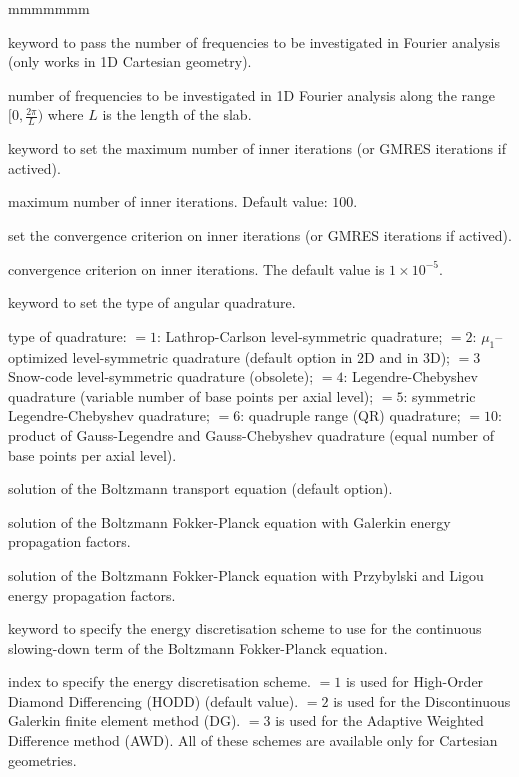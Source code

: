 \begin{ListeDeDescription}{mmmmmmm}
\item[\moc{FOUR}] keyword to pass the number of frequencies to be investigated in Fourier analysis (only works in 1D Cartesian geometry).
\item[\dusa{nfou}] number of frequencies to be investigated in 1D Fourier analysis along the range $[0, \frac{2\pi}{L})$ where $L$ is the length of the slab.

\item[\moc{MAXI}] keyword to set the maximum number of inner iterations (or GMRES iterations if actived).
\item[\dusa{maxi}] maximum number of inner iterations. Default value: $100$.

\item[\moc{EPSI}] set the convergence criterion on inner iterations (or GMRES iterations if actived).
\item[\dusa{epsi}] convergence criterion on inner iterations. The default value is $1\times 10^{-5}$.
\item[\moc{QUAD}] keyword to set the type of angular quadrature.

\item[\dusa{iquad}] type of quadrature: $=1$: Lathrop-Carlson level-symmetric quadrature;
$=2$: $\mu_1$--optimi\-zed level-symmetric quadrature (default option in 2D and in 3D); $=3$ Snow-code level-symmetric quadrature
(obsolete); $=4$: Legendre-Chebyshev quadrature (variable number of base points
per axial level); $=5$: symmetric Legendre-Chebyshev quadrature; $=6$: quadruple range (QR)
quadrature;\cite{quadrupole} $=10$: product of Gauss-Legendre and Gauss-Chebyshev quadrature (equal
number of base points per axial level).

\item[\moc{BTE}] solution of the Boltzmann transport equation (default option).

\item[\moc{BFPG}] solution of the Boltzmann Fokker-Planck equation with Galerkin energy propagation factors.

\item[\moc{BFPL}] solution of the Boltzmann Fokker-Planck equation with Przybylski and Ligou energy propagation factors.\cite{ligou}

\item[\moc{ESCHM}] keyword to specify the energy discretisation scheme to use for the continuous slowing-down term of the Boltzmann Fokker-Planck equation. 

\item[\dusa{eschm}] index to specify the energy discretisation scheme.  $=1$ is used for High-Order Diamond Differencing (HODD) (default value).  $=2$ is used for the Discontinuous Galerkin finite element method (DG).  $=3$ is used for the Adaptive Weighted Difference method (AWD). All of these schemes are available only for Cartesian geometries.


\end{ListeDeDescription}
